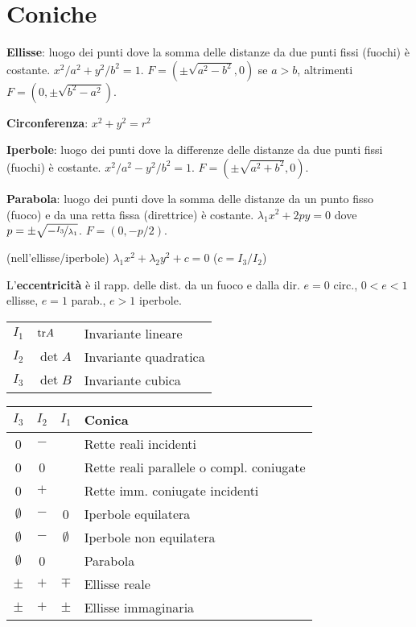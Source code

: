 \section{Coniche}

\textbf{Ellisse}: luogo dei punti dove la somma delle distanze da due punti fissi (fuochi) è costante. $x^2/a^2 + y^2/b^2 = 1$.
$F=(\pm\sqrt{a^2-b^2}, 0)$ se $a>b$, altrimenti $F=(0, \pm\sqrt{b^2-a^2})$.

\textbf{Circonferenza}: $x^2+y^2=r^2$

\textbf{Iperbole}: luogo dei punti dove la differenze delle distanze da due punti fissi (fuochi) è costante. $x^2/a^2 - y^2/b^2 = 1$.
$F=(\pm\sqrt{a^2+b^2}, 0)$.

\textbf{Parabola}: luogo dei punti dove la somma delle distanze da un punto fisso (fuoco) e da una retta fissa (direttrice) è costante. $\lambda_1x^2+2py=0$ dove $p=\pm \sqrt{-\nicefrac{I_3}{\lambda_1}}$.
$F=(0, -p/2)$.

(nell'ellisse/iperbole) $\lambda_1x^2+\lambda_2y^2+c=0$ ($c=I_3/I_2$)

L'\textbf{eccentricità} è il rapp. delle dist. da un fuoco e dalla dir. $e = 0$ circ., $0 < e < 1$ ellisse, $e = 1$ parab., $e > 1$ iperbole. 

\begin{tabular}{lll}
	$I_1$ & $\mathrm{tr} A$ & Invariante lineare \\
	$I_2$ & $\det A$ & Invariante quadratica \\
	$I_3$ & $\det B$ & Invariante cubica
\end{tabular}

\begin{tabular}{c|c|c|l}
	\boldmath$I_3$ & \boldmath$I_2$ & \boldmath$I_1$ & \textbf{Conica} \\
	\hline
	0           & $-$   &       & Rette reali incidenti \\
	0           & 0     &       & Rette reali parallele o compl. coniugate \\
	0           & $+$   &       & Rette imm. coniugate incidenti \\
	\hline
	$\emptyset$ & $-$   & 0     & Iperbole equilatera \\
	$\emptyset$ & $-$   & $\emptyset$ & Iperbole non equilatera \\
	$\emptyset$ & 0     &       & Parabola \\
	$\pm$       & $+$   & $\mp$ & Ellisse reale \\
	$\pm$       & $+$   & $\pm$ & Ellisse immaginaria \\
	\hline
\end{tabular}

